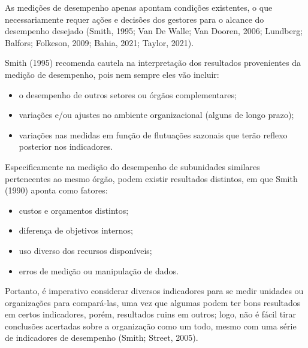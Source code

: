 \documentclass[
  letterpaper,
  DIV=11,
  numbers=noendperiod]{scrreprt}
\begin{document}
\begin{tcolorbox}[enhanced jigsaw, title=\textcolor{quarto-callout-note-color}{\faInfo}\hspace{0.5em}{Nota}, bottomrule=.15mm, arc=.35mm, bottomtitle=1mm, toprule=.15mm, coltitle=black, opacityback=0, colback=white, rightrule=.15mm, breakable, toptitle=1mm, leftrule=.75mm, titlerule=0mm, opacitybacktitle=0.6, colbacktitle=quarto-callout-note-color!10!white, left=2mm, colframe=quarto-callout-note-color-frame]

As medições de desempenho apenas apontam condições existentes, o que
necessariamente requer ações e decisões dos gestores para o alcance do
desempenho desejado (Smith, 1995; Van De Walle; Van Dooren, 2006;
Lundberg; Balfors; Folkeson, 2009; Bahia, 2021; Taylor, 2021).

\end{tcolorbox}

Smith (1995) recomenda cautela na interpretação dos resultados
provenientes da medição de desempenho, pois nem sempre eles vão incluir:

\begin{itemize}
\item
  o desempenho de outros setores ou órgãos complementares;
\item
  variações e/ou ajustes no ambiente organizacional (alguns de longo
  prazo);
\item
  variações nas medidas em função de flutuações sazonais que terão
  reflexo posterior nos indicadores.
\end{itemize}

Especificamente na medição do desempenho de subunidades similares
pertencentes ao mesmo órgão, podem existir resultados distintos, em que
Smith (1990) aponta como fatores:

\begin{itemize}
\item
  custos e orçamentos distintos;
\item
  diferença de objetivos internos;
\item
  uso diverso dos recursos disponíveis;
\item
  erros de medição ou manipulação de dados.
\end{itemize}

Portanto, é imperativo considerar diversos indicadores para se medir
unidades ou organizações para compará-las, uma vez que algumas podem ter
bons resultados em certos indicadores, porém, resultados ruins em
outros; logo, não é fácil tirar conclusões acertadas sobre a organização
como um todo, mesmo com uma série de indicadores de desempenho (Smith;
Street, 2005).
\end{document}

